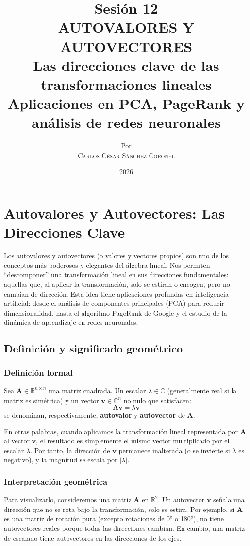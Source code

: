 \documentclass[12pt,a4paper,openany,oneside]{book}
\title{
    \textbf{Sesión 12} \\ 
    \Huge \textbf{AUTOVALORES Y AUTOVECTORES} \\
    \large Las direcciones clave de las transformaciones lineales \\
    \normalsize Aplicaciones en PCA, PageRank y análisis de redes neuronales
}
\author{
    \small Por \\ \vspace{0.2cm}
    \Large \textsc{Carlos César Sánchez Coronel}
}
\date{2026}
\begin{document}
\maketitle
\tableofcontents
{}

\chapter{Autovalores y Autovectores: Las Direcciones Clave}

Los autovalores y autovectores (o valores y vectores propios) son uno de los conceptos más poderosos y elegantes del álgebra lineal. Nos permiten ``descomponer'' una transformación lineal en sus direcciones fundamentales: aquellas que, al aplicar la transformación, solo se estiran o encogen, pero no cambian de dirección. Esta idea tiene aplicaciones profundas en inteligencia artificial: desde el análisis de componentes principales (PCA) para reducir dimensionalidad, hasta el algoritmo PageRank de Google y el estudio de la dinámica de aprendizaje en redes neuronales.

\section{Definición y significado geométrico}

\subsection{Definición formal}
Sea $\mathbf{A} \in \mathbb{R}^{n \times n}$ una matriz cuadrada. Un escalar $\lambda \in \mathbb{C}$ (generalmente real si la matriz es simétrica) y un vector $\mathbf{v} \in \mathbb{C}^n$ no nulo que satisfacen:
\[
\mathbf{A} \mathbf{v} = \lambda \mathbf{v}
\]
se denominan, respectivamente, \textbf{autovalor} y \textbf{autovector} de $\mathbf{A}$.

En otras palabras, cuando aplicamos la transformación lineal representada por $\mathbf{A}$ al vector $\mathbf{v}$, el resultado es simplemente el mismo vector multiplicado por el escalar $\lambda$. Por tanto, la dirección de $\mathbf{v}$ permanece inalterada (o se invierte si $\lambda$ es negativo), y la magnitud se escala por $|\lambda|$.

\subsection{Interpretación geométrica}
Para visualizarlo, consideremos una matriz $\mathbf{A}$ en $\mathbb{R}^2$. Un autovector $\mathbf{v}$ señala una dirección que no se rota bajo la transformación, solo se estira. Por ejemplo, si $\mathbf{A}$ es una matriz de rotación pura (excepto rotaciones de 0° o 180°), no tiene autovectores reales porque todas las direcciones cambian. En cambio, una matriz de escalado tiene autovectores en las direcciones de los ejes.
\end{document}
